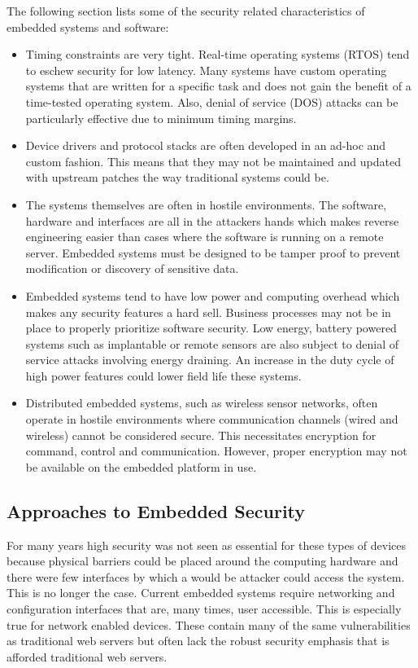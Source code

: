 \documentclass[final]{article}
\begin{document}
The following section lists some of the security related characteristics of embedded systems and software:

\begin{itemize}
\item 
Timing constraints are very tight.  Real-time operating systems (RTOS) tend to eschew security for low latency.  Many systems have custom operating systems that are written for a specific task and does not gain the benefit of a time-tested operating system.  Also, denial of service (DOS) attacks can be particularly effective due to minimum timing margins. \cite{Catal2011}
\item
Device drivers and protocol stacks are often developed in an ad-hoc and custom fashion.  This means that they may not be maintained and updated with upstream patches the way traditional systems could be.
\item 
The systems themselves are often in hostile environments. The software, hardware and interfaces are all in the attackers hands which makes reverse engineering easier than cases where the software is running on a remote server.  Embedded systems must be designed to be tamper proof to prevent modification or discovery of sensitive data.
\item 
Embedded systems tend to have low power and computing overhead which makes any security features a hard sell. Business processes may not be in place to properly prioritize software security.
Low energy, battery powered systems such as implantable or remote sensors are also subject to denial of service attacks involving energy draining.  An increase in the duty cycle of high power features could lower field life these systems. \cite{Vasserman2013}
\item 
Distributed embedded systems, such as wireless sensor networks, often operate in hostile environments where communication channels (wired and wireless) cannot be considered secure.  This necessitates encryption for command, control and communication. However, proper encryption may not be available on the embedded platform in use. \cite{Bojinov2010}
\end{itemize}

\subsection{Approaches to Embedded Security}

For many years high security was not seen as essential for these types of devices because physical barriers could be placed around the computing hardware and there were few interfaces by which a would be attacker could access the system.  This is no longer the case.  Current embedded systems require networking and configuration interfaces that are, many times, user accessible.  This is especially true for network enabled devices.  These contain many of the same vulnerabilities as traditional web servers but often lack the robust security emphasis that is afforded traditional web servers. \cite{Kumar2012}
\end{document}
